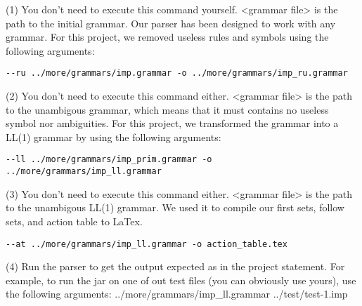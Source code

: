 \documentclass[11pt]{article}
\begin{document}
(1) You don't need to execute this command yourself. <grammar file> is the path to the initial grammar.
Our parser has been designed to work with any grammar. For this project, we removed useless rules and symbols
using the following arguments:
\begin{lstlisting}
--ru ../more/grammars/imp.grammar -o ../more/grammars/imp_ru.grammar
\end{lstlisting}

(2) You don't need to execute this command either. <grammar file> is the path to the unambigous grammar, which
means that it must contains no useless symbol nor ambiguities.
For this project, we transformed the grammar into a LL(1) grammar by using the following arguments:
\begin{lstlisting}
--ll ../more/grammars/imp_prim.grammar -o ../more/grammars/imp_ll.grammar
\end{lstlisting}

(3) You don't need to execute this command either. <grammar file> is the path to the unambigous LL(1) grammar.
We used it to compile our first sets, follow sets, and action table to LaTex.
\begin{lstlisting}
--at ../more/grammars/imp_ll.grammar -o action_table.tex
\end{lstlisting}

(4) Run the parser to get the output expected as in the project statement.
For example, to run the jar on one of out test files (you can obviously use yours), use the following arguments:
../more/grammars/imp\_ll.grammar ../test/test-1.imp
\end{document}
